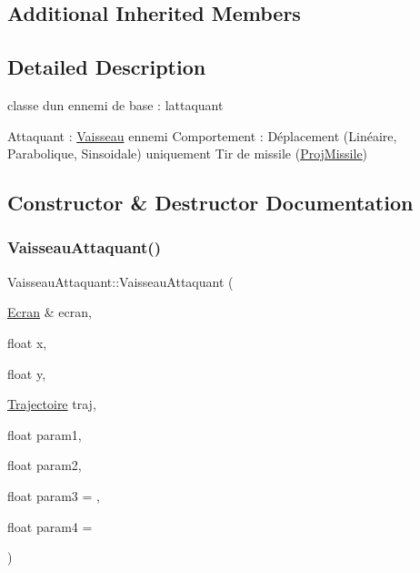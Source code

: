 \subsection*{Additional Inherited Members}


\subsection{Detailed Description}
classe d\textquotesingle{}un ennemi de base \+: l\textquotesingle{}attaquant 

Attaquant \+: \mbox{\hyperlink{class_vaisseau}{Vaisseau}} ennemi Comportement \+: Déplacement (Linéaire, Parabolique, Sinsoidale) uniquement Tir de missile (\mbox{\hyperlink{class_proj_missile}{Proj\+Missile}}) 

\subsection{Constructor \& Destructor Documentation}
\mbox{\label{class_vaisseau_attaquant_af4eff1782c7e67adad4e23aec3e03333}} 
\subsubsection{\texorpdfstring{Vaisseau\+Attaquant()}{VaisseauAttaquant()}}
{\footnotesize\ttfamily Vaisseau\+Attaquant\+::\+Vaisseau\+Attaquant (\begin{DoxyParamCaption}\item[{\mbox{\hyperlink{class_ecran}{Ecran}} \&}]{ecran,  }\item[{float}]{x,  }\item[{float}]{y,  }\item[{\mbox{\hyperlink{_trajectoire_8h_afa7f6e8323d7ee755d93cd1f6019dd95}{Trajectoire}}}]{traj,  }\item[{float}]{param1,  }\item[{float}]{param2,  }\item[{float}]{param3 = {},  }\item[{float}]{param4 = {} }\end{DoxyParamCaption})}

\mbox{\label{class_vaisseau_attaquant_a2707dcc90692ba6132ec6aeb659d3620}} 
